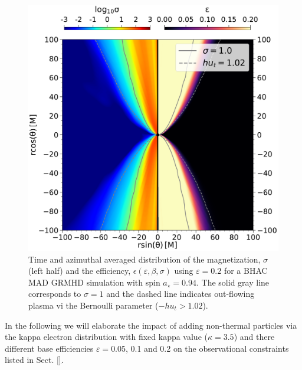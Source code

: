 \begin{figure}
  \centering
    \includegraphics[width=\columnwidth]{./figures/GRMHDphiavera0.94sigmaeta.pdf}
  \caption{Time and azimuthal averaged distribution of the magnetization, $\sigma$ (left half) and the efficiency, $\epsilon(\varepsilon,\beta,\sigma)$ using $\varepsilon=0.2 $ for a BHAC MAD GRMHD simulation with spin $a_{\star}=0.94$. The solid gray line corresponds to $\sigma=1$ and the dashed line indicates out-flowing plasma vi the Bernoulli parameter ($-h u_{t}>1.02$).}
  \label{fig:varepsilon}
\end{figure}

In the following we will elaborate the impact of adding non-thermal particles via the kappa electron distribution with fixed kappa value ($\kappa=3.5$) and there different base efficiencies $\varepsilon=$0.05, 0.1 and 0.2 on the observational constraints listed in Sect. \ref{}.

